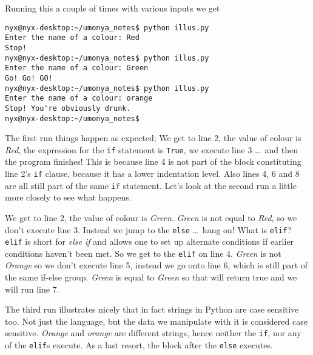 Running this a couple of times with various inputs we get
\begin{lstlisting}
nyx@nyx-desktop:~/umonya_notes$ python illus.py 
Enter the name of a colour: Red
Stop!
nyx@nyx-desktop:~/umonya_notes$ python illus.py 
Enter the name of a colour: Green
Go! Go! GO!
nyx@nyx-desktop:~/umonya_notes$ python illus.py 
Enter the name of a colour: orange
Stop! You're obviously drunk.
nyx@nyx-desktop:~/umonya_notes$
\end{lstlisting}

The first run things happen as expected; We get to line 2, the value   of colour is \textit{Red}, the expression for the \texttt{if} statement is \texttt{True},   we execute line 3 \ldots\ and then the program finishes! This is because   line 4 is not part of the block constituting line 2's \texttt{if} clause,   because it has a lower indentation level. Also lines 4, 6 and 8 are   all still part of the same \texttt{if} statement. Let's look at the second run a   little more closely to see what happens.

We get to line 2, the value of colour is \textit{Green}.   \textit{Green} is not equal to \textit{Red}, so we don't execute line   3. Instead we jump to the \texttt{else} \ldots\ hang on! What is \texttt{elif}? \texttt{elif} is   short for \textit{else if} and allows one to set up alternate conditions if   earlier conditions haven't been met. So we get to the \texttt{elif} on line 4.   \textit{Green} is not \textit{Orange} so we don't execute line 5, instead we go onto line 6, which is still part of the same if-else group. \textit{Green} is equal to \textit{Green} so that will return true and we will run line 7.

The third run illustrates nicely that in fact strings in Python are   case sensitive too. Not just the language, but the data we manipulate   with it is considered case sensitive. \textit{Orange} and \textit{orange} are different   strings, hence neither the \texttt{if}, nor any of the \texttt{elif}s execute. As a last resort, the block after the \texttt{else} executes.

